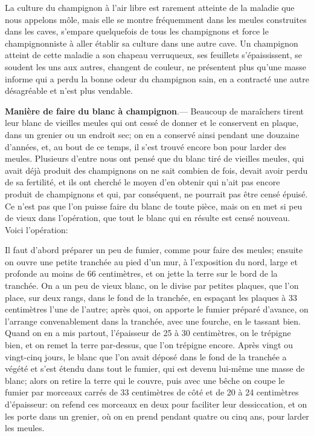 \documentclass[10pt,a4paper]{book}
\begin{document}
La culture du champignon à l'air libre est rarement atteinte de la maladie que nous appelons môle, mais elle se montre fréquemment dans les meules construites dans les caves, s'empare quelquefois de tous les champignons et force le champignonniste à aller établir sa culture dans une autre cave. Un champignon atteint de cette maladie a son chapeau verruqueux, ses feuillets s'épaississent, se soudent les uns aux autres, changent de couleur, ne présentent plus qu'une masse informe qui a perdu la bonne odeur du champignon sain, en a contracté une autre désagréable et n'est plus vendable.

\textbf{Manière de faire du blanc à champignon}.--- Beaucoup de maraîchers tirent leur blanc de vieilles meules qui ont cessé de donner et le conservent en plaque, dans un grenier ou un endroit sec; on en a conservé ainsi pendant une douzaine d'années, et, au bout de ce temps, il s'est trouvé encore bon pour larder des meules. Plusieurs d'entre nous ont pensé que du blanc tiré de vieilles meules, qui avait déjà produit des champignons on ne sait combien de fois, devait avoir perdu de sa fertilité, et ils ont cherché le moyen d'en obtenir qui n'ait pas encore produit de champignons et qui, par conséquent, ne pourrait pas être censé épuisé. Ce n'est pas que l'on puisse faire du blanc de toute pièce, mais on en met si peu de vieux dans l'opération, que tout le blanc qui en résulte est censé nouveau. Voici l'opération:

Il faut d'abord préparer un peu de fumier, comme pour faire des meules; ensuite on ouvre une petite tranchée au pied d'un mur, à l'exposition du nord, large et profonde au moins de 66 centimètres, et on jette la terre sur le bord de la tranchée. On a un peu de vieux blanc, on le divise par petites plaques, que l'on place, sur deux rangs, dans le fond de la tranchée, en espaçant les plaques à 33 centimètres l'une de l'autre; après quoi, on apporte le fumier préparé d'avance, on l'arrange convenablement dans la tranchée, avec une fourche, en le tassant bien. Quand on en a mis partout, l'épaisseur de 25 à 30 centimètres, on le trépigne bien, et on remet la terre par-dessus, que l'on trépigne encore. Après vingt ou vingt-cinq jours, le blanc que l'on avait déposé dans le fond de la tranchée a végété et s'est étendu dans tout le fumier, qui est devenu lui-même une masse de blanc; alors on retire la terre qui le couvre, puis avec une bêche on coupe le fumier par morceaux carrés de 33 centimètres de côté et de 20 à 24 centimètres d'épaisseur: on refend ces morceaux en deux pour faciliter leur dessiccation, et on les porte dans un grenier, où on en prend pendant quatre ou cinq ans, pour larder les meules.
\end{document}
